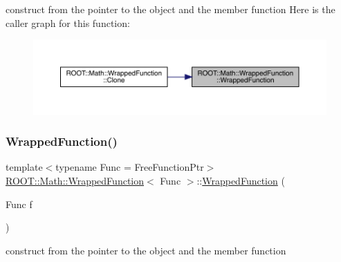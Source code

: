construct from the pointer to the object and the member function Here is the caller graph for this function\+:\nopagebreak
\begin{figure}[H]
\begin{center}
\leavevmode
\includegraphics[width=350pt]{de/d34/classROOT_1_1Math_1_1WrappedFunction_aa5dcde11a189a6fccb4262d341f31146_icgraph}
\end{center}
\end{figure}
\mbox{\label{classROOT_1_1Math_1_1WrappedFunction_aa5dcde11a189a6fccb4262d341f31146}} 
\subsubsection{\texorpdfstring{WrappedFunction()}{WrappedFunction()}\hspace{0.1cm}{\footnotesize\ttfamily [2/3]}}
{\footnotesize\ttfamily template$<$typename Func  = Free\+Function\+Ptr$>$ \\
\mbox{\hyperlink{classROOT_1_1Math_1_1WrappedFunction}{R\+O\+O\+T\+::\+Math\+::\+Wrapped\+Function}}$<$ Func $>$\+::\mbox{\hyperlink{classROOT_1_1Math_1_1WrappedFunction}{Wrapped\+Function}} (\begin{DoxyParamCaption}\item[{Func}]{f }\end{DoxyParamCaption})\hspace{0.3cm}{\ttfamily [inline]}}

construct from the pointer to the object and the member function \mbox{\label{classROOT_1_1Math_1_1WrappedFunction_aa5dcde11a189a6fccb4262d341f31146}} 
